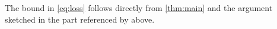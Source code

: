 The bound in
\eqref{eq:loss}
follows directly from
\cref{thm:main}
and the argument sketched in the part referenced by  above.
